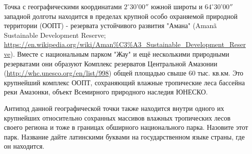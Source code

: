 
Точка с географическими координатами $2^{\circ} 30’00''$ южной широты и $64^{\circ} 30’00''$ западной 
долготы находится в пределах крупной особо охраняемой природной территории (ООПТ) - резервата устойчивого развития "Амана" 
(Amanã Sustainable \linebreak Development Reserve; \url{https://en.wikipedia.org/wiki/Aman%C3%A3_Sustainable}\linebreak \url{_Development_Reserve}). 
Вместе с национальным парком "Жау" и ещё несколькими природными резерватами они образуют Комплекс резерватов Центральной Амазонии (\url{http://whc.unesco.org/en/list/998}) общей площадью свыше 60 тыс. кв.км. Это крупнейший комплекс ООПТ, сохраняющий влажные тропические леса бассейна реки Амазонки, объект Всемирного природного наследия ЮНЕСКО.

Антипод данной географической точки также находится внутри одного их крупнейших относительно сохранных массивов 
влажных тропических лесов своего региона и тоже в границах обширного национального парка. Назовите этот парк. Название дайте латинскими буквами на государственном языке страны, где он находится.

